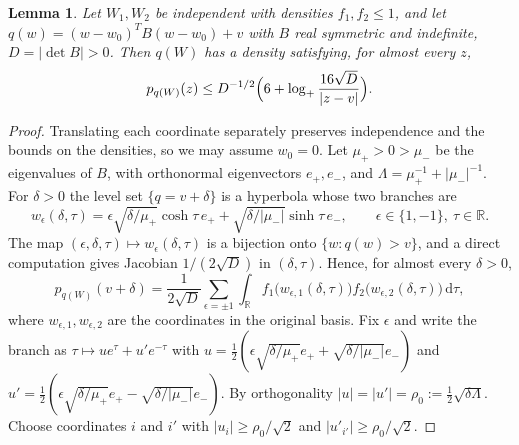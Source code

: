 \documentclass[11pt]{amsart}
\numberwithin{equation}{section}
\newtheorem{lemma}[theorem]{Lemma}
\theoremstyle{definition}
\theoremstyle{remark}
\newcommand{\R}{\mathbb R}
\newcommand{\1}{\mathbf 1}
\newcommand{\dd}{\,\mathrm d}
\newcommand{\logp}{\log_+}
\newcommand{\abs}[1]{\lvert #1\rvert}
\begin{document}
\begin{lemma}\label{lem:hyperbola}
Let $W_1,W_2$ be independent with densities $f_1,f_2\le1$, and let $q(w)=(w-w_0)^TB(w-w_0)+v$ with $B$ real symmetric and indefinite, $D=\abs{\det B}>0$. Then $q(W)$ has a density satisfying, for almost every $z$,
\begin{equation}\label{eq:hyperbola}
p_{q(W)}(z)\le D^{-1/2}\Bigl(6+\logp\frac{16\sqrt D}{\abs{z-v}}\Bigr).
\end{equation}
\end{lemma}

\begin{proof}
Translating each coordinate separately preserves independence and the bounds on the densities, so we may assume $w_0=0$. Let $\mu_+>0>\mu_-$ be the eigenvalues of $B$, with orthonormal eigenvectors $e_+,e_-$, and $\Lambda=\mu_+^{-1}+\abs{\mu_-}^{-1}$. For $\delta>0$ the level set $\{q=v+\delta\}$ is a hyperbola whose two branches are
\[
w_\epsilon(\delta,\tau)=\epsilon\sqrt{\delta/\mu_+}\cosh\tau\,e_++\sqrt{\delta/\abs{\mu_-}}\sinh\tau\,e_-,\qquad\epsilon\in\{1,-1\},\ \tau\in\R .
\]
The map $(\epsilon,\delta,\tau)\mapsto w_\epsilon(\delta,\tau)$ is a bijection onto $\{w:q(w)>v\}$, and a direct computation gives Jacobian $1/(2\sqrt D)$ in $(\delta,\tau)$. Hence, for almost every $\delta>0$,
\[
p_{q(W)}(v+\delta)=\frac1{2\sqrt D}\sum_{\epsilon=\pm1}\int_\R f_1\bigl(w_{\epsilon,1}(\delta,\tau)\bigr)f_2\bigl(w_{\epsilon,2}(\delta,\tau)\bigr)\dd\tau,
\]
where $w_{\epsilon,1},w_{\epsilon,2}$ are the coordinates in the original basis. Fix $\epsilon$ and write the branch as $\tau\mapsto ue^\tau+u'e^{-\tau}$ with $u=\frac12(\epsilon\sqrt{\delta/\mu_+}e_++\sqrt{\delta/\abs{\mu_-}}e_-)$ and $u'=\frac12(\epsilon\sqrt{\delta/\mu_+}e_+-\sqrt{\delta/\abs{\mu_-}}e_-)$. By orthogonality $\abs u=\abs{u'}=\rho_0:=\frac12\sqrt{\delta\Lambda}$. Choose coordinates $i$ and $i'$ with $\abs{u_i}\ge\rho_0/\sqrt2$ and $\abs{u'_{i'}}\ge\rho_0/\sqrt2$.


\end{proof}
\end{document}
